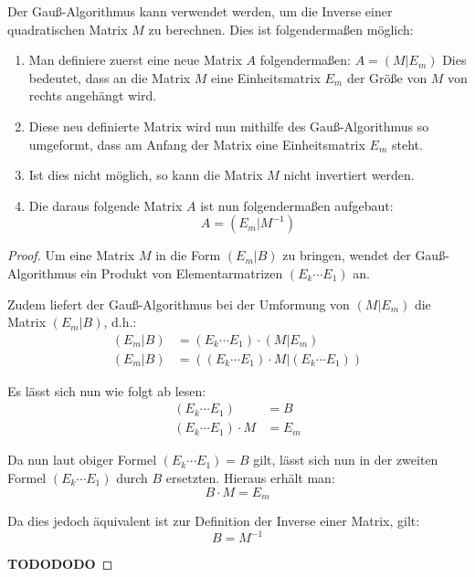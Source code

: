 Der Gauß-Algorithmus kann verwendet werden, um die Inverse einer quadratischen Matrix $M$ zu berechnen.
Dies ist folgendermaßen möglich:

\begin{enumerate}
\item Man definiere zuerst eine neue Matrix $A$ folgendermaßen:
$A = (M|E_m)$
Dies bedeutet, dass an die Matrix $M$ eine Einheitsmatrix $E_m$ der Größe von $M$ von rechts angehängt wird. 
\item Diese neu definierte Matrix wird nun mithilfe des Gauß-Algorithmus so umgeformt, dass am Anfang der Matrix eine Einheitsmatrix $E_m$ steht.
\item Ist dies nicht möglich, so kann die Matrix $M$ nicht invertiert werden.
\item Die daraus folgende Matrix $A$ ist nun folgendermaßen aufgebaut: \[ A = (E_m|M^{-1}) \]
\end{enumerate}

\begin{proof}
Um eine Matrix $M$ in die Form $(E_m|B)$ zu bringen, wendet der Gauß-Algorithmus ein Produkt von Elementarmatrizen $(E_k \cdots E_1)$ an.

Zudem liefert der Gauß-Algorithmus bei der Umformung von $(M|E_m)$ die Matrix $(E_m|B)$, d.h.: 
\begin{align*}
  (E_m|B) &= (E_k \cdots E_1) \cdot (M|E_m)\\ 
  (E_m|B) &= ((E_k \cdots E_1) \cdot M | (E_k \cdots E_1))
\end{align*}

Es lässt sich nun wie folgt ab lesen:
\begin{align*}
 (E_k \cdots E_1) &= B \\
(E_k \cdots E_1) \cdot M &= E_m
\end{align*}

Da nun laut obiger Formel $(E_k \cdots E_1) = B$ gilt, lässt sich nun in der zweiten Formel $(E_k \cdots E_1)$ durch $B$ ersetzten. Hieraus erhält man:
\[ B\cdot M = E_m \]

Da dies jedoch äquivalent ist zur Definition der Inverse einer Matrix, gilt:
\[ B=M^{-1}\]

\textbf{TODODODO}

\end{proof}